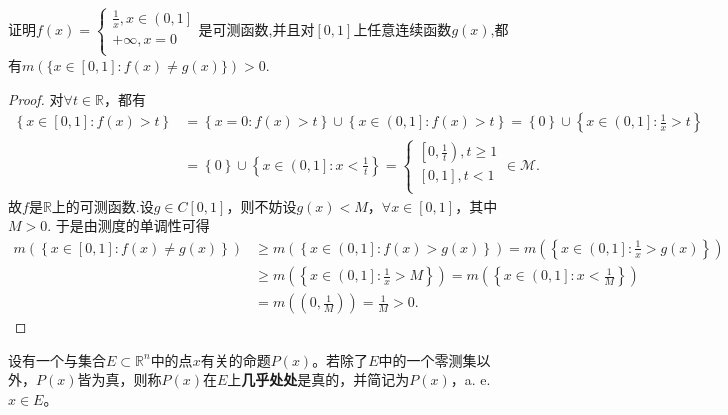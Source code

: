 \documentclass[../../main.tex]{subfiles}
\begin{document}
\begin{example}
证明$f\left( x \right) =\begin{cases}
\frac{1}{x},x\in \left( 0,1 \right]\\
+\infty ,x=0\\
\end{cases}$是可测函数,并且对$[0,1]$上任意连续函数$g(x)$,都有$m(\{x\in [0,1]:f(x)\ne g(x)\})>0$.
\end{example}
\begin{proof}
对$\forall t\in \mathbb{R}$，都有
\begin{align*}
\left\{ x\in \left[ 0,1 \right] :f\left( x \right) >t \right\} &=\left\{ x=0:f\left( x \right) >t \right\} \cup \left\{ x\in \left( 0,1 \right] :f\left( x \right) >t \right\} =\left\{ 0 \right\} \cup \left\{ x\in \left( 0,1 \right] :\frac{1}{x}>t \right\} 
\\
&=\left\{ 0 \right\} \cup \left\{ x\in \left( 0,1 \right] :x<\frac{1}{t} \right\} =\begin{cases}
\left[ 0,\frac{1}{t} \right) ,t\geqslant 1\\
\left[ 0,1 \right] ,t<1\\
\end{cases}\in \mathscr{M} .
\end{align*}
故$f$是$\mathbb{R}$上的可测函数.设$g\in C\left[ 0,1 \right]$，则不妨设$g\left( x \right) <M$，$\forall x\in \left[ 0,1 \right]$，其中$M>0$.
于是由测度的单调性可得
\begin{align*}
m\left( \left\{ x\in \left[ 0,1 \right] :f\left( x \right) \ne g\left( x \right) \right\} \right) &\geqslant m\left( \left\{ x\in \left( 0,1 \right] :f\left( x \right) >g\left( x \right) \right\} \right) =m\left( \left\{ x\in \left( 0,1 \right] :\frac{1}{x}>g\left( x \right) \right\} \right) 
\\
&\geqslant m\left( \left\{ x\in \left( 0,1 \right] :\frac{1}{x}>M \right\} \right) =m\left( \left\{ x\in \left( 0,1 \right] :x<\frac{1}{M} \right\} \right) 
\\
&=m\left( \left( 0,\frac{1}{M} \right) \right) =\frac{1}{M}>0.
\end{align*}
\end{proof}

\begin{definition}
设有一个与集合$E \subset \mathbb{R}^n$中的点$x$有关的命题$P(x)$。若除了$E$中的一个零测集以外，$P(x)$皆为真，则称$P(x)$在$E$上\textbf{几乎处处}是真的，并简记为$P(x)$，a. e.$ x\in E$。
\end{definition}
\end{document}
